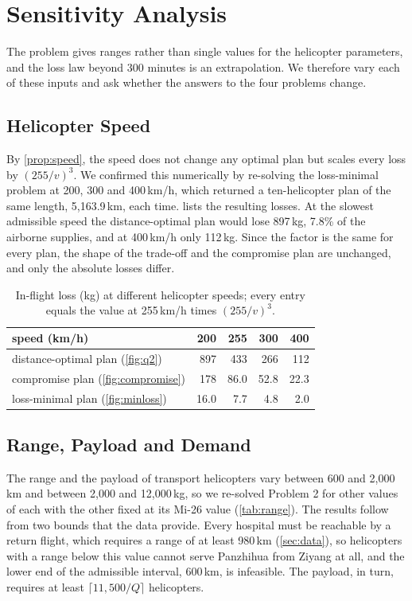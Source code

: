 \documentclass[11pt,a4paper]{article}
\theoremstyle{definition}
\begin{document}
\section{Sensitivity Analysis}\label{sec:sensitivity}

The problem gives ranges rather than single values for the helicopter parameters, and the loss law beyond 300 minutes is an extrapolation.
We therefore vary each of these inputs and ask whether the answers to the four problems change.

\subsection{Helicopter Speed}\label{sec:sens-speed}
By \cref{prop:speed}, the speed does not change any optimal plan but scales every loss by $(255/v)^3$.
We confirmed this numerically by re-solving the loss-minimal problem at 200, 300 and 400\,km/h, which returned a ten-helicopter plan of the same length, 5{,}163.9\,km, each time.
 lists the resulting losses.
At the slowest admissible speed the distance-optimal plan would lose 897\,kg, 7.8\% of the airborne supplies, and at 400\,km/h only 112\,kg.
Since the factor is the same for every plan, the shape of the trade-off and the compromise plan are unchanged, and only the absolute losses differ.

\begin{table}[ht]
\centering
\caption{In-flight loss (kg) at different helicopter speeds; every entry equals the value at 255\,km/h times $(255/v)^3$.}\label{tab:speed}
\small
\begin{tabular}{lrrrr}
\toprule
speed (km/h) & 200 & 255 & 300 & 400 \\
\midrule
distance-optimal plan (\cref{fig:q2}) & 897 & 433 & 266 & 112 \\
compromise plan (\cref{fig:compromise}) & 178 & 86.0 & 52.8 & 22.3 \\
loss-minimal plan (\cref{fig:minloss}) & 16.0 & 7.7 & 4.8 & 2.0 \\
\bottomrule
\end{tabular}
\end{table}

\subsection{Range, Payload and Demand}\label{sec:sens-range}
The range and the payload of transport helicopters vary between 600 and 2{,}000\,km and between 2{,}000 and 12{,}000\,kg, so we re-solved Problem 2 for other values of each with the other fixed at its Mi-26 value (\cref{tab:range}).
The results follow from two bounds that the data provide.
Every hospital must be reachable by a return flight, which requires a range of at least 980\,km (\cref{sec:data}), so helicopters with a range below this value cannot serve Panzhihua from Ziyang at all, and the lower end of the admissible interval, 600\,km, is infeasible.
The payload, in turn, requires at least $\lceil 11{,}500/Q\rceil$ helicopters.
\end{document}
